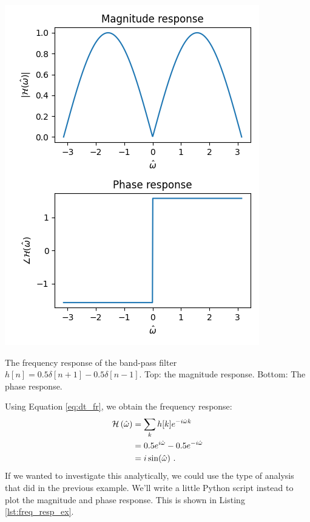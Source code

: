 \begin{marginfigure}
    \begin{center}
        \includegraphics[width=\textwidth]{code/019_frequency_response/bpf_fresp.png}
    \end{center}
    \caption{The frequency response of the band-pass filter $h[n]=0.5\delta[n+1]-0.5\delta[n-1]$.
        Top: the magnitude response. Bottom: The phase response.}
    \label{fig:example_bpf_fresp}
\end{marginfigure}

Using Equation \ref{eq:dt_fr}, we obtain the frequency response:
\begin{align}
    \mathcal{H}\left(\hat{\omega}\right) & = \sum_k h[k] e^{-i\hat{\omega}k}               \\
        & = 0.5e^{i\hat{\omega}} -  0.5e^{-i\hat{\omega}} \\
        & = i \sin(\hat{\omega}) \,\,.
\end{align}
If we wanted to investigate this analytically, we could use the type
of analysis that did in the previous example. We'll write a little
Python script instead to plot the magnitude and phase response.
This is shown in Listing \ref{lst:freq_resp_ex}.


